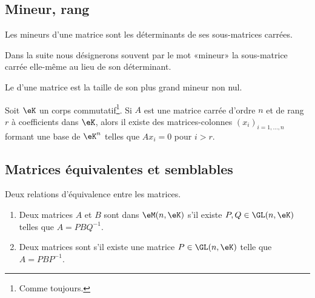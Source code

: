 \subsection{Mineur, rang}

\begin{definition}
    Les mineurs d'une matrice sont les déterminants de ses sous-matrices carrées.
\end{definition}
Dans la suite nous désignerons souvent par le mot «mineur» la sous-matrice carrée elle-même au lieu de son déterminant.

\begin{definition}      \label{DEFooVVBYooJbliTi}
    Le  d'une matrice est la taille de son plus grand mineur non nul.
\end{definition}

\begin{lemma} \label{LEMVecsaRgFixe}
Soit \( \eK \) un corps commutatif\footnote{Comme toujours.}. Si \( A \) est une matrice carrée d'ordre \( n \) et de rang \( r \) à coefficients dans \( \eK \), alors il existe des matrices-colonnes \( (x_i)_{i=1,\dots,n} \) formant une base de \( \eK^n \) telles que \( Ax_i = 0 \) pour \( i > r \).
\end{lemma}

\subsection{Matrices équivalentes et semblables}

\begin{definition}  \label{DefBLELooTvlHoB}
    Deux relations d'équivalence entre les matrices.
    \begin{enumerate}
        \item   \label{ItemPFXCooOUbSCt}
    Deux matrices \( A\) et \( B\) sont  dans \( \eM(n,\eK)\) s'il existe \( P,Q\in\GL(n,\eK)\) telles que \( A=PBQ^{-1}\).
\item
    Deux matrices sont  s'il existe une matrice \( P\in \GL(n,\eK)\) telle que \( A=PBP^{-1}\).
    \end{enumerate}
\end{definition}

